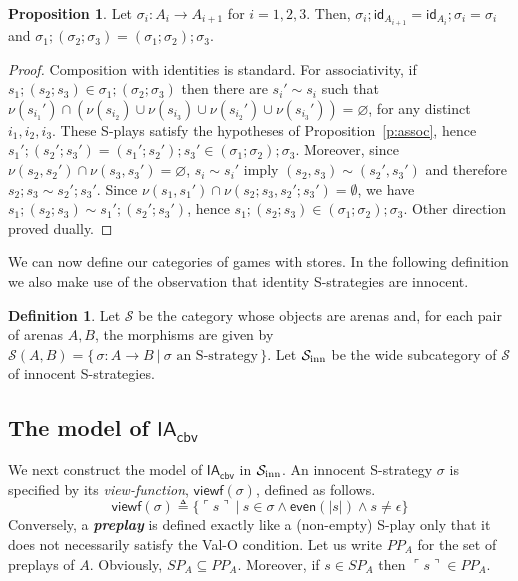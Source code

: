 \documentclass{CSML}
\theoremstyle{definition}\newtheorem{definition}[thm]{Definition}
\theoremstyle{definition}\newtheorem{example}[thm]{Example}
\theoremstyle{definition}\newtheorem{proposition}[thm]{Proposition}
\theoremstyle{definition}\newtheorem{lemma}[thm]{Lemma}
\theoremstyle{definition}\newtheorem{theorem}[thm]{Theorem}
\theoremstyle{definition}\newtheorem{corollary}[thm]{Corollary}
\theoremstyle{definition}\newtheorem{remark}[thm]{Remark}
\newcommand\nt[1]{#1}
\newcommand\Scat{\mathcal{S}}
\newcommand\Scatinn{\Scat_{\rm inn}}
\newcommand\defn{\triangleq}
\newcommand\arr{\rightarrow}
\newcommand\id{\mathsf{id}}
\newcommand\viewf{\mathsf{viewf}}
\newcommand\preplays[1]{\mathit{PP}_{#1}}
\newcommand\Splays[1]{\mathit{SP}_{#1}}
\newcommand\boldemph[1]{\emph{\textbf{#1}}}
\newcommand\iacbv{\mathsf{IA}_{\mathsf{cbv}}}
\newcommand\pview[1]{\ulcorner{#1}\urcorner}
\newcommand\pv[1]{\pview{#1}}
\newcommand\makeset[1]{\{\,#1\,\}}
\begin{document}
\begin{proposition}
Let $\sigma_i:A_i\arr A_{i+1}$ for $i=1,2,3$. Then, $\sigma_i;\id_{A_{i+1}}=\id_{A_i};\sigma_i=\sigma_i$ and $\sigma_1;(\sigma_2;\sigma_3)=(\sigma_1;\sigma_2);\sigma_3$.
\end{proposition}
\begin{proof}
Composition with identities is standard. For associativity, if $s_1;(s_2;s_3)\in \sigma_1;(\sigma_2;\sigma_3)$ then there are $s_i'\sim s_i$ such that $\nu(s_{i_1}')\cap(\nu(s_{i_2})\cup\nu(s_{i_3})\cup\nu(s_{i_2}')\cup\nu(s_{i_3}'))=\varnothing$, for any distinct $i_1,i_2,i_3$. These S-plays satisfy the hypotheses of Proposition~\ref{p:assoc}, hence $s_1';(s_2';s_3')=(s_1';s_2');s_3'\in(\sigma_1;\sigma_2);\sigma_3$. Moreover, since $\nu(s_2,s_2')\cap\nu(s_3,s_3')=\varnothing$, $s_i\sim s_i'$ imply $(s_2,s_3)\sim(s_2',s_3')$ and therefore $s_2;s_3\sim s_2';s_3'$.
Since 
{$\nu(s_1,s_1')\cap\nu(s_2;s_3,s_2';s_3')=\emptyset$,}
we have $s_1;(s_2;s_3)\sim s_1';(s_2';s_3')$, hence $s_1;(s_2;s_3)\in(\sigma_1;\sigma_2);\sigma_3$. Other direction proved dually.
\end{proof}

We can now define our categories of games with stores. \nt{In the following definition we also make use of the observation that identity S-strategies are innocent.}

\begin{definition}
Let $\Scat$ be the category whose objects are arenas and, for each pair of arenas $A,B$, the morphisms are given by
$\Scat(A,B) = \makeset{\sigma:A\to B\ |\ \sigma\text{ an S-strategy}}$. Let $\Scatinn$ be the wide subcategory of $\Scat$ of innocent S-strategies.
\end{definition}

\subsection{The model of \texorpdfstring{$\iacbv$}{IAcbv}}

We next construct the model of $\iacbv$ in $\Scatinn$.
An innocent S-strategy $\sigma$ is specified by its \emph{view-function}, $\viewf(\sigma)$, defined as follows.
\[ 
\viewf(\sigma)\defn \{\pv{s}\ |\ s\in\sigma\land \mathsf{even}(|s|)\land s\not=\epsilon\} 
\]
Conversely, a \boldemph{preplay} is defined exactly like a (non-empty) S-play only that it does not necessarily satisfy the Val-O condition. Let us write $\preplays{A}$ for the set of preplays of $A$. Obviously, $\Splays{A}\subseteq\preplays{A}$. Moreover, if $s\in\Splays{A}$ then $\pv{s}\in\preplays{A}$. 
\end{document}
